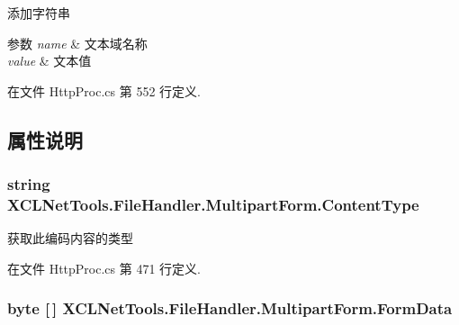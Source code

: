 添加字符串 


\begin{DoxyParams}{参数}
{\em name} & 文本域名称\\
\hline
{\em value} & 文本值\\
\hline
\end{DoxyParams}


在文件 Http\+Proc.\+cs 第 552 行定义.



\subsection{属性说明}
\subsubsection[{\texorpdfstring{Content\+Type}{ContentType}}]{\setlength{\rightskip}{0pt plus 5cm}string X\+C\+L\+Net\+Tools.\+File\+Handler.\+Multipart\+Form.\+Content\+Type\hspace{0.3cm}{\ttfamily [get]}}\hypertarget{class_x_c_l_net_tools_1_1_file_handler_1_1_multipart_form_a634f22e875a4d7eb49a729dcb2903f86}{}\label{class_x_c_l_net_tools_1_1_file_handler_1_1_multipart_form_a634f22e875a4d7eb49a729dcb2903f86}


获取此编码内容的类型 



在文件 Http\+Proc.\+cs 第 471 行定义.

\subsubsection[{\texorpdfstring{Form\+Data}{FormData}}]{\setlength{\rightskip}{0pt plus 5cm}byte \mbox{[}$\,$\mbox{]} X\+C\+L\+Net\+Tools.\+File\+Handler.\+Multipart\+Form.\+Form\+Data\hspace{0.3cm}{\ttfamily [get]}}\hypertarget{class_x_c_l_net_tools_1_1_file_handler_1_1_multipart_form_ad540886372239dbb4fcc975e694be5d9}{}\label{class_x_c_l_net_tools_1_1_file_handler_1_1_multipart_form_ad540886372239dbb4fcc975e694be5d9}


